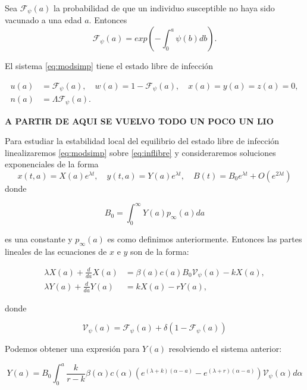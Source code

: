 \documentclass[
]{book}
\begin{document}
Sea \(\mathscr{F}_\psi (a)\) la probabilidad de que un individuo susceptible no haya sido vacunado a una edad \(a\). Entonces
\[\mathscr{F}_\psi (a) = exp\left(-\int_0^a \psi(b) db \right).\]

El sistema \eqref{eq:modsimp} tiene el estado libre de infección

\begin{equation}
\begin{split}
u(a) &= \mathscr{F}_\psi (a), \quad w(a) = 1 - \mathscr{F}_\psi (a), \quad x(a) = y(a) = z(a) = 0, \\
n(a) &= \Lambda \mathscr{F}_\psi (a).
\end{split}
\label{eq:inflibre}
\end{equation}

\textbf{A PARTIR DE AQUI SE VUELVO TODO UN POCO UN LIO}

Para estudiar la estabilidad local del equilibrio del estado libre de infección linealizaremos \eqref{eq:modsimp} sobre \eqref{eq:inflibre} y consideraremos soluciones exponenciales de la forma
\[x(t,a) = X(a)e^{\lambda t}, \quad y(t,a) = Y(a)e^{\lambda t}, \quad B(t) = B_0e^{\lambda t}
                                                                            + O(e^{2\lambda t})\]
donde

\begin{equation}
B_0 = \int_0^\infty Y(a) p_\infty(a) da
\label{eq:B0}
\end{equation}

es una constante y \(p_\infty (a)\) es como definimos anteriormente. Entonces las partes lineales de las ecuaciones de \(x\) e \(y\) son de la forma:

\begin{align*}
\lambda X(a) + \frac{d}{da}X(a) &= \beta(a)c(a)B_0 \mathscr{V}_\psi (a) - kX(a), \\
\lambda Y(a) + \frac{d}{da}Y(a) &= kX(a) - rY(a) ,
\end{align*}

donde

\begin{equation}
\mathscr{V}_\psi (a) = \mathscr{F}_\psi (a) + \delta(1- \mathscr{F}_\psi (a))
\label{eq:Vtonta}
\end{equation}

Podemos obtener una expresión para \(Y(a)\) resolviendo el sistema anterior:

\begin{equation}
Y(a) = B_0 \int_0^a \frac{k}{r-k} \beta(\alpha) c(\alpha) 
\left(  
e^{(\lambda + k)(\alpha - a)} - 
e^{(\lambda + r)(\alpha - a)}
\right)
\mathscr{V}_\psi (\alpha) d \alpha
\label{eq:Ydea}
\end{equation}
\end{document}
